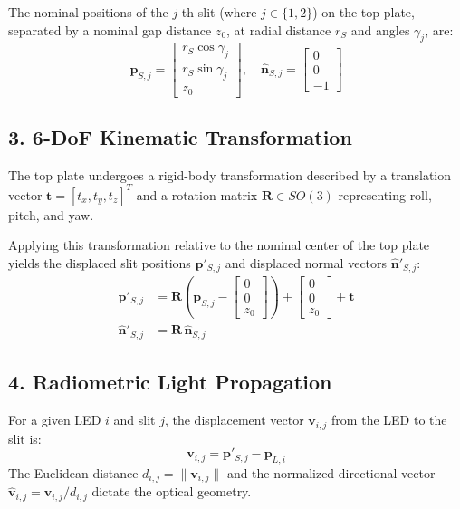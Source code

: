 \documentclass{article}
\begin{document}
The nominal positions of the $j$-th slit (where $j \in \{1, 2\}$) on the top plate, separated by a nominal gap distance $z_0$, at radial distance $r_S$ and angles $\gamma_j$, are:
\begin{equation}
    \mathbf{p}_{S,j} = \begin{bmatrix} r_S \cos\gamma_j \\ r_S \sin\gamma_j \\ z_0 \end{bmatrix}, \quad \mathbf{\hat{n}}_{S,j} = \begin{bmatrix} 0 \\ 0 \\ -1 \end{bmatrix}
\end{equation}

\subsection*{3. 6-DoF Kinematic Transformation}
The top plate undergoes a rigid-body transformation described by a translation vector $\mathbf{t} = [t_x, t_y, t_z]^T$ and a rotation matrix $\mathbf{R} \in SO(3)$ representing roll, pitch, and yaw. 

Applying this transformation relative to the nominal center of the top plate yields the displaced slit positions $\mathbf{p}'_{S,j}$ and displaced normal vectors $\mathbf{\hat{n}}'_{S,j}$:
\begin{align}
    \mathbf{p}'_{S,j} &= \mathbf{R} \left( \mathbf{p}_{S,j} - \begin{bmatrix} 0 \\ 0 \\ z_0 \end{bmatrix} \right) + \begin{bmatrix} 0 \\ 0 \\ z_0 \end{bmatrix} + \mathbf{t} \\
    \mathbf{\hat{n}}'_{S,j} &= \mathbf{R} \, \mathbf{\hat{n}}_{S,j}
\end{align}

\subsection*{4. Radiometric Light Propagation}
For a given LED $i$ and slit $j$, the displacement vector $\mathbf{v}_{i,j}$ from the LED to the slit is:
\begin{equation}
    \mathbf{v}_{i,j} = \mathbf{p}'_{S,j} - \mathbf{p}_{L,i}
\end{equation}
The Euclidean distance $d_{i,j} = \|\mathbf{v}_{i,j}\|$ and the normalized directional vector $\mathbf{\hat{v}}_{i,j} = \mathbf{v}_{i,j} / d_{i,j}$ dictate the optical geometry.
\end{document}
